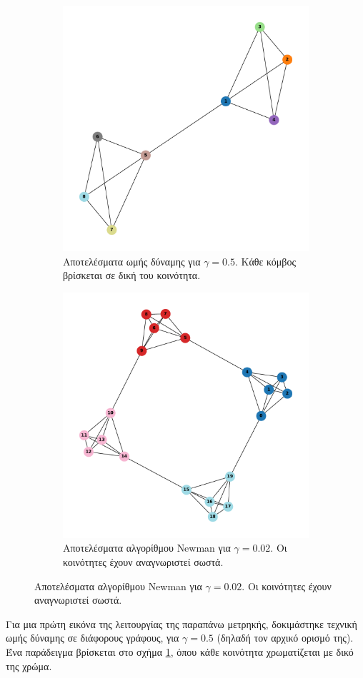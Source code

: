 \documentclass[12pt, letterpaper]{article}
\begin{document}
\begin{figure}
  \begin{subfigure}{0.5\textwidth}
    \centering 
    \includegraphics[width=0.5\linewidth]{quad_comm_gamma=0.5.pdf}
    \caption{Αποτελέσματα ωμής δύναμης για $\gamma = 0.5$. Κάθε κόμβος βρίσκεται σε δική του κοινότητα.}
    \label{fig:graph8comm}
  \end{subfigure}
  \begin{subfigure}{0.5\textwidth}
    \centering 
    \includegraphics[width=0.7\linewidth]{cluster_4,5gamma=0.02,newman.pdf}
    \caption{Αποτελέσματα αλγορίθμου \textlatin{Newman} για $\gamma = 0.02$. Οι κοινότητες έχουν αναγνωριστεί σωστά.}
    \label{fig:newman4,5}
  \end{subfigure}
\end{figure}



Για μια πρώτη εικόνα της λειτουργίας της παραπάνω μετρηκής, δοκιμάστηκε τεχνική ωμής δύναμης σε διάφορους γράφους,
για $\gamma = 0.5$ (δηλαδή τον αρχικό ορισμό της).
Ένα παράδειγμα βρίσκεται στο σχήμα \ref{fig:graph8comm}, όπου κάθε κοινότητα χρωματίζεται με δικό της χρώμα. 
\end{document}
